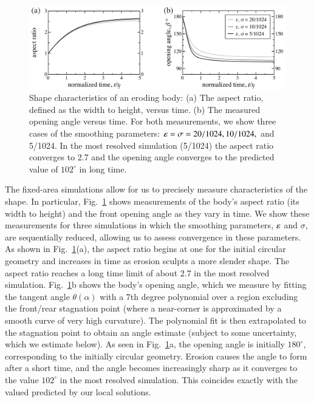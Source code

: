 \documentclass[preprint, 10pt]{elsarticle}
\begin{document}
\begin{figure}%
\begin{center}
\includegraphics[width = 0.85 \textwidth]{./figs/arangle.pdf}
\caption{Shape characteristics of an eroding body: (a) The aspect ratio, defined as the width to height, versus time. (b) The measured opening angle versus time. For both measurements, we show three cases of the smoothing parameters: $\varepsilon = \sigma = 20/1024, 10/1024,$ and 5/1024. In the most resolved simulation (5/1024) the aspect ratio converges to 2.7 and the opening angle converges to the predicted value of $102^{\circ}$ in long time.}
\label{fig:arangle}
\end{center}
\end{figure}

The fixed-area simulations allow for us to precisely measure characteristics of the shape. In particular, Fig.~\ref{fig:arangle} shows measurements of the body's aspect ratio (its width to height) and the front opening angle as they vary in time. We show these measurements for three simulations in which the smoothing parameters, $\varepsilon$ and $\sigma$, are sequentially reduced, allowing us to assess convergence in these parameters. As shown in Fig.~\ref{fig:arangle}(a), the aspect ratio begins at one for the initial circular geometry and increases in time as erosion sculpts a more slender shape. The aspect ratio reaches a long time limit of about 2.7 in the most resolved simulation. Fig.~\ref{fig:arangle}b shows the body's opening angle, which we measure by fitting the tangent angle $\theta(\alpha)$ with a 7th degree polynomial over a region excluding the front/rear stagnation point (where a near-corner is approximated by a smooth curve of very high curvature). The polynomial fit is then extrapolated to the stagnation point to obtain an angle estimate (subject to some uncertainty, which we estimate below). As seen in Fig.~\ref{fig:arangle}a, the opening angle is initially $180^\circ$, corresponding to the initially circular geometry. Erosion causes the angle to form after a short time, and the angle becomes increasingly sharp as it converges to the value $102^\circ$ in the most resolved simulation. This coincides exactly with the valued predicted by our local solutions.
\end{document}
